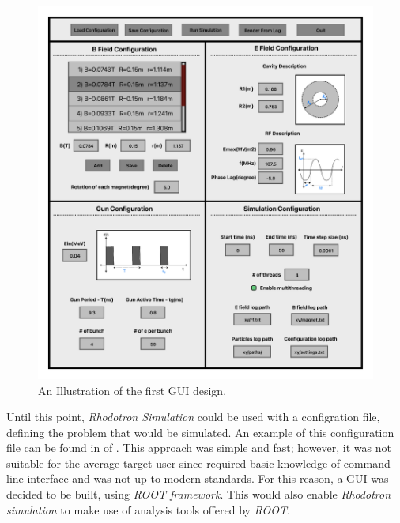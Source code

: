 \documentclass[a4paper,oneside,12pt]{report}
\numberwithin{equation}{chapter}
\begin{document}
\begin{figure}[H]
    \centering
    \includegraphics[width=\linewidth]{./figures/illustrations/RhodoSim_GUI_Draft_V02.pdf}
    \caption{An Illustration of the first GUI design.}
    \label{fig:gui_illustration}
\end{figure}
Until this point, \textit{Rhodotron Simulation} could be used with a configration file, defining the problem that would be simulated.
An example of this configuration file can be found in  of . 
This approach was simple and fast; however, it was not suitable for the average target user since required basic knowledge of command line interface and was not up to modern standards.
For this reason, a GUI was decided to be built, using \textit{ROOT framework}. 
This would also enable \textit{Rhodotron simulation} to make use of analysis tools offered by \textit{ROOT}.
\end{document}

